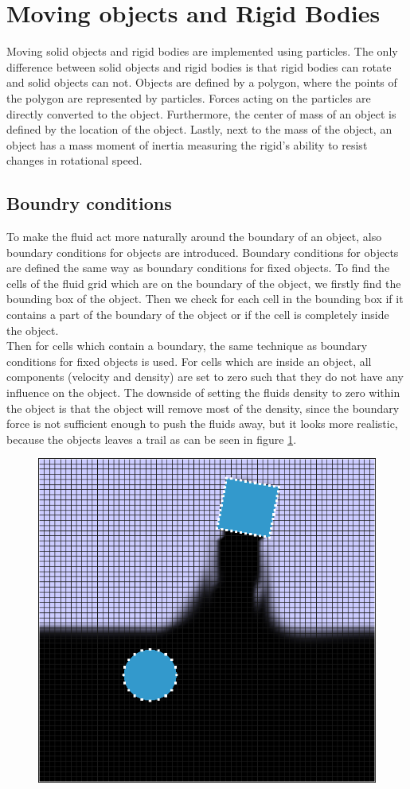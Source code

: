 \section{Moving objects and Rigid Bodies}
Moving solid objects and rigid bodies are implemented using particles. The only difference between solid objects and rigid bodies is that rigid bodies can rotate and solid objects can not. Objects are defined by a polygon, where the points of the polygon are represented by particles. Forces acting on the particles are directly converted to the object. Furthermore, the center of mass of an object is defined by the location of the object. Lastly, next to the mass of the object, an object has a mass moment of inertia measuring the rigid's ability to resist changes in rotational speed.

\subsection{Boundry conditions}
To make the fluid act more naturally around the boundary of an object, also boundary conditions for objects are introduced. Boundary conditions for objects are defined the same way as boundary conditions for fixed objects. To find the cells of the fluid grid which are on the boundary of the object, we firstly find the bounding box of the object. Then we check for each cell in the bounding box if it contains a part of the boundary of the object or if the cell is completely inside the object.\\
Then for cells which contain a boundary, the same technique as boundary conditions for fixed objects is used. For cells which are inside an object, all components (velocity and density) are set to zero such that they do not have any influence on the object. The downside of setting the fluids density to zero within the object is that the object will remove most of the density, since the boundary force is not sufficient enough to push the fluids away, but it looks more realistic, because the objects leaves a trail as can be seen in figure \ref{fig:trail}.

\begin{figure}[!tb]
\centering
  \includegraphics[height=0.5\textwidth]{img/trail}
  \label{fig:trail}
\end{figure}
